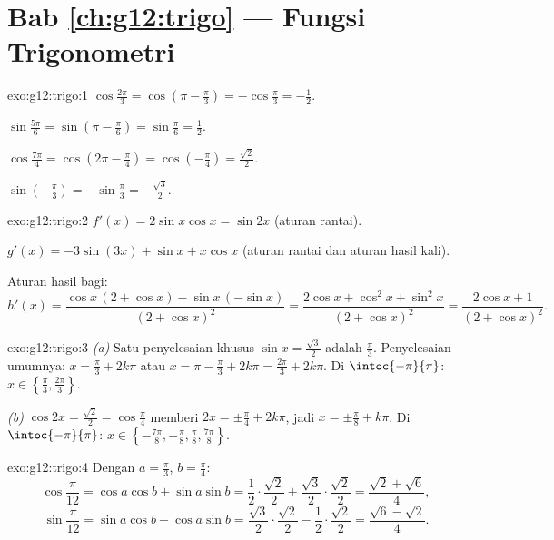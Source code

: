 \section*{Bab \ref{ch:g12:trigo} --- Fungsi Trigonometri}

\begin{solution}{exo:g12:trigo:1}
$\cos\frac{2\pi}{3} = \cos\left(\pi - \frac\pi3\right) = -\cos\frac\pi3
= -\frac12$.

$\sin\frac{5\pi}{6} = \sin\left(\pi - \frac\pi6\right) = \sin\frac\pi6
= \frac12$.

$\cos\frac{7\pi}{4} = \cos\left(2\pi - \frac{\pi}{4}\right)
= \cos\left(-\frac\pi4\right) = \frac{\sqrt2}{2}$.

$\sin\left(-\frac\pi3\right) = -\sin\frac\pi3 = -\frac{\sqrt3}{2}$.
\end{solution}

\begin{solution}{exo:g12:trigo:2}
$f'(x) = 2\sin x\cos x = \sin 2x$ (aturan rantai).

$g'(x) = -3\sin(3x) + \sin x + x\cos x$ (aturan rantai dan aturan hasil kali).

Aturan hasil bagi:
\[
h'(x) = \frac{\cos x\,(2 + \cos x) - \sin x\,(-\sin x)}{(2+\cos x)^2}
= \frac{2\cos x + \cos^2 x + \sin^2 x}{(2+\cos x)^2}
= \frac{2\cos x + 1}{(2+\cos x)^2}.
\]
\end{solution}

\begin{solution}{exo:g12:trigo:3}
\emph{(a)} Satu penyelesaian khusus $\sin x = \frac{\sqrt3}{2}$ adalah
$\frac\pi3$. Penyelesaian umumnya: $x = \frac\pi3 + 2k\pi$ atau
$x = \pi - \frac\pi3 + 2k\pi = \frac{2\pi}{3} + 2k\pi$. Di
$\intoc{-\pi}{\pi}$: $x \in \left\{\frac\pi3, \frac{2\pi}{3}\right\}$.

\emph{(b)} $\cos 2x = \frac{\sqrt2}{2} = \cos\frac\pi4$ memberi
$2x = \pm\frac\pi4 + 2k\pi$, jadi $x = \pm\frac\pi8 + k\pi$. Di
$\intoc{-\pi}{\pi}$:
$x \in \left\{-\frac{7\pi}{8}, -\frac\pi8, \frac\pi8, \frac{7\pi}{8}\right\}$.
\end{solution}

\begin{solution}{exo:g12:trigo:4}
Dengan $a = \frac\pi3$, $b = \frac\pi4$:
\[
\cos\frac{\pi}{12} = \cos a\cos b + \sin a \sin b
= \frac12\cdot\frac{\sqrt2}{2} + \frac{\sqrt3}{2}\cdot\frac{\sqrt2}{2}
= \frac{\sqrt2 + \sqrt6}{4},
\]
\[
\sin\frac{\pi}{12} = \sin a\cos b - \cos a \sin b
= \frac{\sqrt3}{2}\cdot\frac{\sqrt2}{2} - \frac12\cdot\frac{\sqrt2}{2}
= \frac{\sqrt6 - \sqrt2}{4}.
\]
\end{solution}

